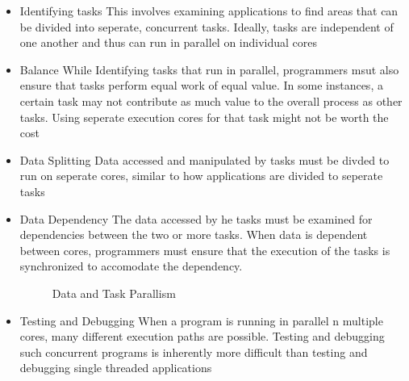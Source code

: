 \documentclass{book}
\begin{document}
            \begin{itemize}
                \item Identifying tasks
                    \subitem This involves examining applications to find areas that can be divided into seperate, concurrent tasks. Ideally, tasks
                    are independent of one another and thus can run in parallel on individual cores
                \item Balance
                    \subitem While Identifying tasks that run in parallel, programmers msut also ensure that tasks perform equal work of equal value.
                    In some instances, a certain task may not contribute as much value to the overall process as other tasks. Using seperate execution cores
                    for that task might not be worth the cost
                \item Data Splitting
                    \subitem Data accessed and manipulated by tasks must be divded to run on seperate cores, similar to how applications are divided to seperate tasks
                \item Data Dependency
                    \subitem The data accessed by he tasks must be examined for dependencies between the two or more tasks. When data is dependent between cores,
                    programmers must ensure that the execution of the tasks is synchronized to accomodate the dependency.
                    \begin{figure}[H]
                        \centering
                        \caption{Data and Task Parallism}
                    \end{figure}
                \item Testing and Debugging
                    \subitem When a program is running in parallel n multiple cores, many different execution paths are possible. Testing and debugging such
                    concurrent programs is inherently more difficult than testing and debugging single threaded applications
            \end{itemize}
\end{document}
